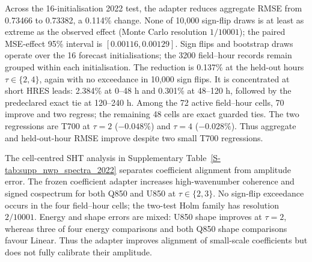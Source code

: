 \documentclass[referee,lineno,pdflatex,sn-nature]{sn-jnl}
\begin{document}
Across the 16-initialisation 2022 test, the adapter reduces
aggregate RMSE from 0.73466 to 0.73382, a 0.114\% change. None of 10,000
sign-flip draws is at least as extreme as the observed effect (Monte Carlo
resolution $1/10001$); the paired MSE-effect 95\% interval is
$[0.00116,0.00129]$. Sign flips and bootstrap draws operate over the 16
forecast initialisations; the 3200 field--hour records remain grouped within
each initialisation. The reduction is
0.137\% at the held-out hours
$\tau\in\{2,4\}$, again with no exceedance in 10,000 sign flips. It is
concentrated at short HRES
leads: 2.384\% at 0--48 h and 0.301\% at 48--120 h, followed by the
predeclared exact tie at 120--240 h. Among the 72 active field--hour cells,
70 improve and two regress; the remaining 48 cells are exact guarded ties.
The two regressions are T700 at $\tau=2$
($-0.048\%$) and $\tau=4$ ($-0.028\%$). Thus aggregate and held-out-hour RMSE
improve despite two small T700 regressions.

The cell-centred SHT analysis in Supplementary
Table~\ref{S-tab:supp_nwp_spectra_2022} separates coefficient alignment from
amplitude error. The frozen
coefficient adapter increases high-wavenumber coherence and signed cospectrum for
both Q850 and U850 at $\tau\in\{2,3\}$. No sign-flip exceedance occurs in
the four field--hour cells; the two-test Holm family has resolution
$2/10001$. Energy and shape errors
are mixed: U850 shape improves at $\tau=2$, whereas three of four energy
comparisons and both Q850 shape comparisons favour Linear. Thus the adapter
improves alignment of small-scale coefficients but does not fully calibrate
their amplitude.
\end{document}
